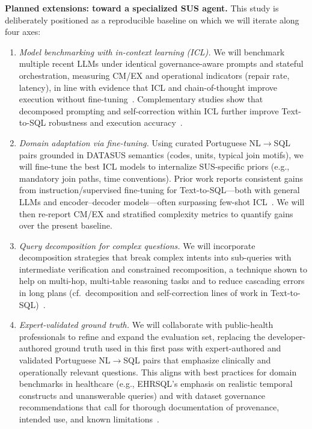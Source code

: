 \documentclass[sigconf,natbib=false]{acmart}
\begin{document}
\textbf{Planned extensions: toward a specialized SUS agent.}
This study is deliberately positioned as a reproducible baseline on which we will iterate along four axes:
\begin{enumerate}
    \item \textit{Model benchmarking with in-context learning (ICL).} We will benchmark multiple recent LLMs under identical governance-aware prompts and stateful orchestration, measuring CM/EX and operational indicators (repair rate, latency), in line with evidence that ICL and chain-of-thought improve execution without fine-tuning~\cite{zhang2023actsql}. Complementary studies show that decomposed prompting and self-correction within ICL further improve Text-to-SQL robustness and execution accuracy~\cite{liu2023divideprompt,dinsql2024,hong2024survey}.
    \item \textit{Domain adaptation via fine-tuning.} Using curated Portuguese NL$\rightarrow$SQL pairs grounded in DATASUS semantics (codes, units, typical join motifs), we will fine-tune the best ICL models to internalize SUS-specific priors (e.g., mandatory join paths, time conventions). Prior work reports consistent gains from instruction/supervised fine-tuning for Text-to-SQL—both with general LLMs and encoder–decoder models—often surpassing few-shot ICL~\cite{sun2024sqlpalm,scholak2021picard,resdsql2023,lee2023ehrsql}. We will then re-report CM/EX and stratified complexity metrics to quantify gains over the present baseline.
    \item \textit{Query decomposition for complex questions.} We will incorporate decomposition strategies that break complex intents into sub-queries with intermediate verification and constrained recomposition, a technique shown to help on multi-hop, multi-table reasoning tasks and to reduce cascading errors in long plans (cf.\ decomposition and self-correction lines of work in Text-to-SQL)~\cite{dinsql2024,liu2023divideprompt,dac2024}.

    \item \textit{Expert-validated ground truth.} We will collaborate with public-health professionals to refine and expand the evaluation set, replacing the developer-authored ground truth used in this first pass with expert-authored and validated Portuguese NL$\rightarrow$SQL pairs that emphasize clinically and operationally relevant questions. This aligns with best practices for domain benchmarks in healthcare (e.g., EHRSQL’s emphasis on realistic temporal constructs and unanswerable queries) and with dataset governance recommendations that call for thorough documentation of provenance, intended use, and known limitations~\cite{lee2023ehrsql,gebru2021datasheets}.

\end{enumerate}
\end{document}
